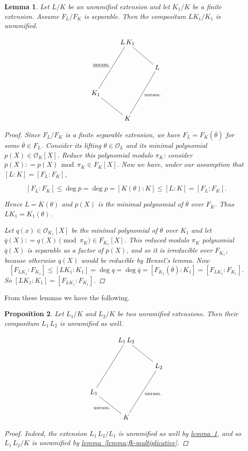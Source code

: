 \documentclass{article}
\newcommand{\dfn}{\mathrel{\mathop:}=}
\renewcommand{\mod}{\mathop{\,\mathrm{mod}\,}}
\newcommand{\refref}[2]{\hyperref[#2]{#1~\ref*{#2}}}
\theoremstyle{myplain}
\newtheorem{proposition}{Proposition}[section]
\newtheorem{lemma}[proposition]{Lemma}
\theoremstyle{mydefinition}
\begin{document}
\begin{lemma}\label{lemma:compositum-unramified}
  Let $L/K$ be an unramified extension and let $K_1/K$ be a finite
  extension. Assume $F_L/F_K$ is separable. Then the compositum $LK_1 / K_1$ is
  unramified.

  \[ \xymatrix{
      & L \, K_1\ar@{-}[ddl]_{\underline{\mathrm{unram.}}}\ar@{-}[dr] \\
      & & L\ar@{-}[ddl]^{\mathrm{unram.}} \\
      K_1\ar@{-}[dr] & & \\
      & K
    } \]

  \begin{proof}
    Since $F_L / F_K$ is a finite separable extension, we have
    $F_L = F_K (\overline{\theta})$ for some $\overline{\theta} \in
    F_L$. Consider its lifting $\theta \in \mathcal{O}_L$ and its minimal polynomial
    $p (X) \in \mathcal{O}_K [X]$. Reduce this polynomial modulo $\pi_K$: consider
    $\overline{p} (X) \dfn p (X) \mod \pi_K \in F_K [X]$. Now we have, under our
    assumption that $[L:K] = [F_L:F_K]$,

    \[ [F_L : F_K] \le \deg \overline{p} = \deg {p} =
      [K (\theta) : K] \le [L : K] = [F_L : F_K]. \]

    Hence $L = K (\theta)$ and $\overline{p} (X)$ is the minimal polynomial of
    $\overline{\theta}$ over $F_K$. Thus $L K_1 = K_1 (\theta)$.

    Let $q (x) \in \mathcal{O}_{K_1} [X]$ be the minimal polynomial of $\theta$ over
    $K_1$ and let $\overline{q} (X) \dfn q (X) \pmod \pi_K \in F_{K_1}
    [X]$. This reduced modulo $\pi_K$ polynomial $\overline{q} (X)$ is separable
    as a factor of $\overline{p} (X)$, and so it is irreducible over $F_{K_1}$,
    because otherwise $q (X)$ would be reducible by Hensel's lemma. Now
    \[ [F_{L K_1} : F_{K_1}] \le [L K_1 : K_1] = \deg q =
      \deg \overline{q} = [F_{K_1} (\overline{\theta}) : K_1] =
      [F_{L K_1} : F_{K_1}]. \]
    So $[L K_1 : K_1] = [F_{L K_1} : F_{K_1}]$.
  \end{proof}
\end{lemma}

\vspace{1em}

From these lemmas we have the following.

\begin{proposition}
  Let $L_1/K$ and $L_2/K$ be two unramified extensions. Then their compositum
  $L_1\,L_2$ is unramified as well.

  \[ \xymatrix{
      & L_1 \, L_2\ar@{-}[ddl]\ar@{-}[dr] \\
      & & L_2\ar@{-}[ddl]^{\mathrm{unram.}} \\
      L_1\ar@{-}[dr]_{\mathrm{unram.}} & & \\
      & K
    } \]

  \begin{proof}
    Indeed, the extension $L_1\,L_2 / L_1$ is unramified as well by
    \refref{lemma}{lemma:compositum-unramified}, and so $L_1\,L_2 / K$ is
    unramified by \refref{lemma}{lemma:fk-multiplicative}.
  \end{proof}
\end{proposition}
\end{document}
